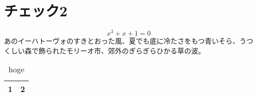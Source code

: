 \section{チェック2}

\begin{equation}
	x^3 + x + 1 = 0
\end{equation}
あのイーハトーヴォのすきとおった風、夏でも底に冷たさをもつ青いそら、うつくしい森で飾られたモリーオ市、郊外のぎらぎらひかる草の波。
\setlength{\abovecaptionskip}{10pt}
\begin{table}[!ht]
	\centering
	\caption{hoge}
	\label{table:fuga}
	\begin{tabular}{c|c} \hline \hline
	1 & 2 \\ \hline
	\end{tabular}
\end{table}
